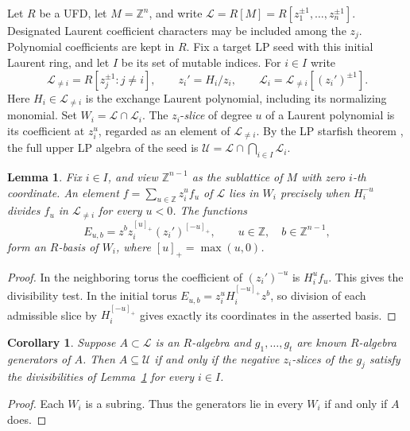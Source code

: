 \documentclass[11pt,reqno]{amsart}
\numberwithin{equation}{section}
\newtheorem{lemma}[theorem]{Lemma}
\newtheorem{corollary}[theorem]{Corollary}
\theoremstyle{definition}
\theoremstyle{remark}
\begin{document}
Let \(R\) be a UFD, let \(M=\mathbb Z^n\), and write
\(\mathcal L=R[M]=R[z_1^{\pm1},\ldots,z_n^{\pm1}]\). Designated Laurent coefficient
characters may be included among the \(z_j\). Polynomial coefficients are
kept in \(R\). Fix a target LP seed with this initial Laurent ring, and let
\(I\) be its set of mutable indices. For \(i\in I\) write
\[ \mathcal L_{\ne i}=R[z_j^{\pm1}:j\ne i],\qquad z_i'=H_i/z_i,\qquad \mathcal L_i=\mathcal L_{\ne i}[(z_i')^{\pm1}]. \]
Here \(H_i\in \mathcal L_{\ne i}\) is the exchange Laurent polynomial,
including its normalizing monomial. Set \(W_i=\mathcal L\cap \mathcal L_i\).
The \(z_i\)-\emph{slice} of degree \(u\) of a Laurent polynomial is
its coefficient at \(z_i^u\), regarded as an element of \(\mathcal L_{\ne i}\).
By the LP starfish theorem \cite[Theorem~1.3]{Branching},
the full upper LP algebra of the seed is
\(\mathcal U=\mathcal L\cap\bigcap_{i\in I}\mathcal L_i\).

\begin{lemma}\label{lem:recognition-rank-one}
Fix \(i\in I\), and view \(\mathbb Z^{n-1}\) as the sublattice of \(M\)
with zero \(i\)-th coordinate. An element
\(f=\sum_{u\in\mathbb Z}z_i^u f_u\) of \(\mathcal L\) lies in \(W_i\) precisely
when \(H_i^{-u}\) divides \(f_u\) in \(\mathcal L_{\ne i}\) for every \(u<0\).
The functions
\[ E_{u,b}=z^b z_i^{[u]_+}(z_i')^{[-u]_+}, \qquad u\in\mathbb Z,\quad b\in\mathbb Z^{n-1}, \]
form an \(R\)-basis of \(W_i\), where \([u]_+=\max(u,0)\).
\end{lemma}
\begin{proof}
In the neighboring torus the coefficient of \((z_i')^{-u}\) is
\(H_i^u f_u\). This gives the divisibility test. In the initial torus
\(E_{u,b}=z_i^uH_i^{[-u]_+}z^b\), so division of each admissible slice by
\(H_i^{[-u]_+}\) gives exactly its coordinates in the asserted basis.
\end{proof}

\begin{corollary}\label{cor:finite-star-generator-test}
Suppose \(A\subset \mathcal L\) is an \(R\)-algebra and \(g_1,\ldots,g_t\) are
known \(R\)-algebra generators of \(A\). Then \(A\subseteq\mathcal U\)
if and only if the negative \(z_i\)-slices of the \(g_j\) satisfy the
divisibilities of Lemma~\ref{lem:recognition-rank-one} for every \(i\in I\).
\end{corollary}
\begin{proof}
Each \(W_i\) is a subring. Thus the generators lie in every \(W_i\)
if and only if \(A\) does.
\end{proof}
\end{document}
